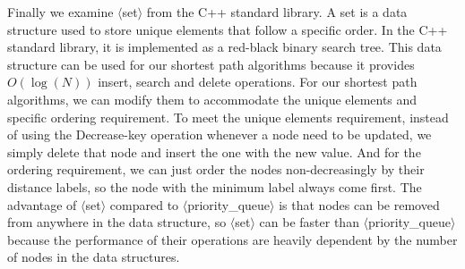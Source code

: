 Finally we examine $\langle$set$\rangle$ from the C++ standard library.
A set is a data structure used to store unique elements that follow a specific order.
In the C++ standard library, it is implemented as a red-black binary search tree.
This data structure can be used for our shortest path algorithms because it provides $O(\log(N))$ insert, search and delete operations.
For our shortest path algorithms,
we can modify them to accommodate the unique elements and specific ordering requirement.
To meet the unique elements requirement,
instead of using the Decrease-key operation whenever a node need to be updated,
we simply delete that node and insert the one with the new value.
And for the ordering requirement,
we can just order the nodes non-decreasingly by their distance labels,
so the node with the minimum label always come first.
The advantage of $\langle$set$\rangle$ compared to $\langle$priority\_queue$\rangle$ is that nodes can be removed from anywhere in the data structure,
so $\langle$set$\rangle$ can be faster than $\langle$priority\_queue$\rangle$ because the performance of their operations are heavily dependent by the number of nodes in the data structures.
